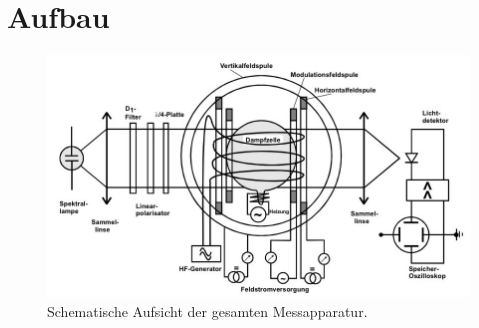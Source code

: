 \section{Aufbau}
\label{sec:Aufbau}

\begin{figure}[H]
	\centering
	\includegraphics[width=0.8\linewidth]{content/grafik/aufbau.jpg}
	\caption{Schematische Aufsicht der gesamten Messapparatur. \cite{pumpen}}
	\label{fig:aufbau}
\end{figure}
